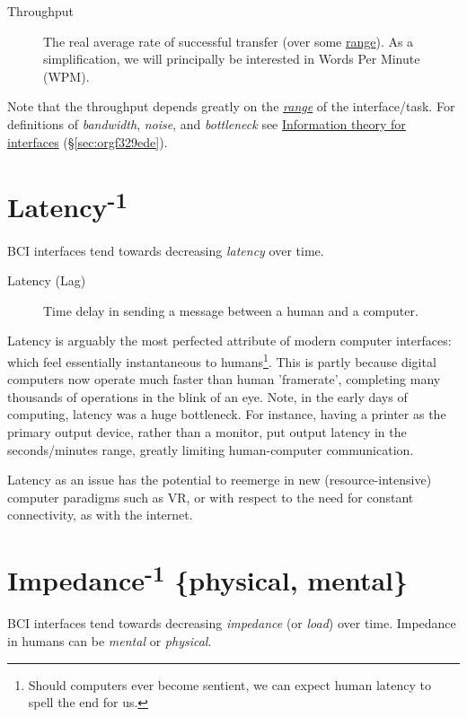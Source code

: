 \documentclass[logo,bsc,singlespacing,parskip]{infthesis}
\begin{document}
\begin{mdframed}
\begin{description}
\item[{Throughput\label{throughput}}] The real average rate of successful transfer (over some  \hyperref[range]{range}). As a simplification, we will principally be interested in Words Per Minute (WPM).
\end{description}
\end{mdframed}

Note that the throughput depends greatly on the \emph{\hyperref[range]{range}} of the interface/task.
For definitions of \emph{bandwidth}, \emph{noise}, and \emph{bottleneck} see \hyperref[sec:orgf329ede]{Information theory for interfaces} (\S \ref{sec:orgf329ede}).

\section{Latency\textsuperscript{-1}}
\label{sec:orge8a6234}
BCI interfaces tend towards decreasing \emph{latency} over time.

\begin{mdframed}
\begin{description}
\item[{Latency\label{latency} (Lag)}] Time delay in sending a message between a human and a computer.
\end{description}
\end{mdframed}

Latency is arguably the most perfected attribute of modern computer interfaces: which feel essentially instantaneous to humans\footnote{Should computers ever become sentient, we can expect human latency to spell the end for us.}.
This is partly because digital computers now operate much faster than human 'framerate', completing many thousands of operations in the blink of an eye.
Note, in the early days of computing, latency was a huge bottleneck.
For instance, having a printer as the primary output device, rather than a monitor, put output latency in the seconds/minutes range, greatly limiting human-computer communication.

Latency as an issue has the potential to reemerge in new (resource-intensive) computer paradigms such as VR, or with respect to the need for constant connectivity, as with the internet.

\section{Impedance\textsuperscript{-1} \{physical, mental\}}
\label{sec:orgb2537b7}
BCI interfaces tend towards decreasing \emph{impedance} (or \emph{load}) over time.
Impedance in humans can be \emph{mental} or \emph{physical}.
\end{document}
